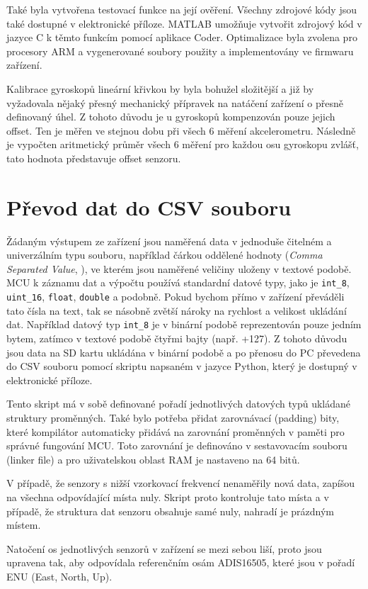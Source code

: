 Také byla vytvořena testovací funkce na její ověření. Všechny zdrojové kódy jsou také dostupné v elektronické příloze. MATLAB umožňuje vytvořit zdrojový kód v jazyce C k těmto funkcím pomocí aplikace Coder. Optimalizace byla zvolena pro procesory ARM a vygenerované soubory použity a implementovány ve firmwaru zařízení. 

Kalibrace gyroskopů lineární křivkou by byla bohužel složitější a již by vyžadovala nějaký přesný mechanický přípravek na natáčení zařízení o přesně definovaný úhel. Z tohoto důvodu je u gyroskopů kompenzován pouze jejich offset. Ten je měřen ve stejnou dobu při všech 6 měření akcelerometru. Následně je vypočten aritmetický průměr všech 6 měření pro každou osu gyroskopu zvlášť, tato hodnota představuje offset senzoru.

\section{Převod dat do CSV souboru}
Žádaným výstupem ze zařízení jsou naměřená data v jednoduše čitelném a univerzálním typu souboru, například čárkou oddělené hodnoty (\emph{Comma Separated Value}, ), ve kterém jsou naměřené veličiny uloženy v textové podobě. \ac{MCU} k záznamu dat a výpočtu používá standardní datové typy, jako je \texttt{int\_8}, \texttt{uint\_16}, \texttt{float}, \texttt{double} a podobně. Pokud bychom přímo v zařízení převáděli tato čísla na text, tak se násobně zvětší nároky na rychlost a velikost ukládání dat. Například datový typ \texttt{int\_8} je v binární podobě reprezentován pouze jedním bytem, zatímco v textové podobě čtyřmi bajty (např. +127). Z tohoto důvodu jsou data na SD kartu ukládána v binární podobě a po přenosu do PC převedena do \ac{CSV} souboru pomocí skriptu napsaném v jazyce Python, který je dostupný v elektronické příloze.

Tento skript má v sobě definované pořadí jednotlivých datových typů ukládané struktury proměnných. Také bylo potřeba přidat zarovnávací (padding) bity, které kompilátor automaticky přidává na zarovnání proměnných v paměti pro správné fungování MCU. Toto zarovnání je definováno v sestavovacím souboru (linker file) a pro uživatelskou oblast RAM je nastaveno na 64 bitů.

V případě, že senzory s nižší vzorkovací frekvencí nenaměřily nová data, zapíšou na všechna odpovídající místa nuly. Skript proto kontroluje tato místa a v případě, že struktura dat senzoru obsahuje samé nuly, nahradí je prázdným místem.

Natočení os jednotlivých senzorů v zařízení se mezi sebou liší, proto jsou upravena tak, aby odpovídala referenčním osám ADIS16505, které jsou v pořadí ENU (East, North, Up).




